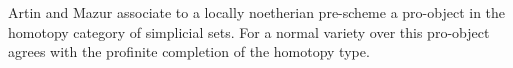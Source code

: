 Artin and Mazur associate to a locally noetherian pre-scheme a pro-object in the homotopy category of simplicial sets. For a normal variety over  this pro-object agrees with the profinite completion of the homotopy type.

